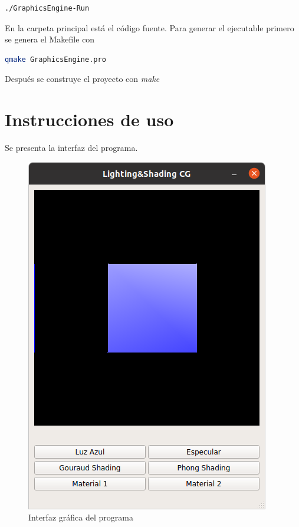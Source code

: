 \documentclass[12pt]{article}
\begin{document}
\begin{lstlisting}[language=bash,title={bash}]
./GraphicsEngine-Run
\end{lstlisting}


En la carpeta principal está el código fuente. Para generar el ejecutable primero se genera el Makefile con

\begin{lstlisting}[language=bash,title={bash}]
 qmake GraphicsEngine.pro
\end{lstlisting}

Después se construye el proyecto con \textit{make}



\section{Instrucciones de uso}
Se presenta la interfaz del programa.

\begin{figure}[H]
\centering
\includegraphics[scale=0.5]{images/gui.png}
\caption{Interfaz gráfica del programa}
\end{figure}
\end{document}
